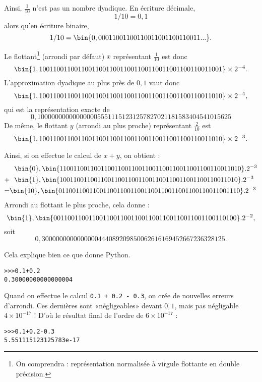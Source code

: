Ainsi, $\frac{1}{10}$ n'est pas un nombre dyadique.  En écriture décimale, 
$$1/10 = 0,1$$ 
alors qu'en écriture binaire, 
$$1/10 = \bin{0,00011001100110011001100110011...}.$$

Le flottant\footnote{On comprendra : représentation normalisée à virgule flottante en double précision.} (arrondi par défaut) $x$ représentant $\frac{1}{10}$ est donc
\begin{equation*}
 \bin{1,1001100110011001100110011001100110011001100110011001}\times 2^{-4}.
\end{equation*}
L'approximation dyadique au plus près de $0,1$ vaut donc
\begin{equation*}
 \bin{1,1001100110011001100110011001100110011001100110011010}\times 2^{-4},
\end{equation*}
qui est la représentation exacte de
\begin{equation*}
 0,1000000000000000055511151231257827021181583404541015625 
\end{equation*}
De même, le flottant $y$ (arrondi au plus proche) représentant
$\frac{2}{10}$ est
\begin{equation*}
 \bin{1,1001100110011001100110011001100110011001100110011010}\times 2^{-3} .
\end{equation*}

Ainsi, si on effectue le calcul de $x+y$, on obtient :
\small
\begin{align*}
&~~\bin{0},  \bin{11001100110011001100110011001100110011001100110011010}.
2^{-3}\\
+&~~\bin{1}, \bin{1001100110011001100110011001100110011001100110011010}.2^{-3}\\
=&\bin{10},\bin{01100110011001100110011001100110011001100110011001110}.
2^{-3}
\end{align*}
\normalsize
Arrondi au flottant le plus proche, cela donne :
\begin{equation*}
\bin{1},  \bin{0011001100110011001100110011001100110011001100110100}.2^{-2},
\end{equation*}
soit
\begin{equation*}
0,3000000000000000444089209850062616169452667236328125.
\end{equation*}

Cela explique bien ce que donne Python.
\begin{lstlisting}
>>>0.1+0.2
0.30000000000000004
\end{lstlisting}
Quand on effectue le calcul \texttt{0.1 + 0.2 - 0.3}, on crée de nouvelles erreurs d'arrondi. Ces dernières sont «négligeables» devant $0,1$, mais pas négligable $4\times 10^{-17}$ !
D'où le résultat final de l'ordre de $6\times 10^{-17}$ : 
\begin{lstlisting}
>>>0.1+0.2-0.3
5.551115123125783e-17
\end{lstlisting}


